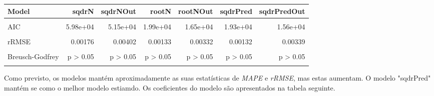 \documentclass[justified, 11pt]{scrartcl}\usepackage[]{graphicx}\usepackage[]{xcolor}
\newenvironment{knitrout}{}{} %
\begin{document}
\begin{knitrout}
\begin{table}
\begin{tabular}{l|r|r|r|r|r|r}
\hline
Model & sqdrN & sqdrNOut & rootN & rootNOut & sqdrPred & sqdrPredOut\\
\hline
\cellcolor{gray!6}{R2} & \cellcolor{gray!6}{0.929} & \cellcolor{gray!6}{0.973} & \cellcolor{gray!6}{0.374} & \cellcolor{gray!6}{0.378} & \cellcolor{gray!6}{0.449} & \cellcolor{gray!6}{0.468}\\
\hline
AIC & 5.98e+04 & 5.15e+04 & 1.99e+04 & 1.65e+04 & 1.93e+04 & 1.56e+04\\
\hline
\cellcolor{gray!6}{MAPE} & \cellcolor{gray!6}{0.129} & \cellcolor{gray!6}{0.109} & \cellcolor{gray!6}{0.0869} & \cellcolor{gray!6}{0.0854} & \cellcolor{gray!6}{0.0854} & \cellcolor{gray!6}{0.0875}\\
\hline
rRMSE & 0.00176 & 0.00402 & 0.00133 & 0.00332 & 0.00132 & 0.00339\\
\hline
\cellcolor{gray!6}{Breusch-Pagan} & \cellcolor{gray!6}{p > 0.05} & \cellcolor{gray!6}{p > 0.05} & \cellcolor{gray!6}{p > 0.05} & \cellcolor{gray!6}{p > 0.05} & \cellcolor{gray!6}{p = 0.0488} & \cellcolor{gray!6}{p > 0.05}\\
\hline
Breusch-Godfrey & p > 0.05 & p > 0.05 & p > 0.05 & p > 0.05 & p > 0.05 & p > 0.05\\
\hline
\cellcolor{gray!6}{Jarque-Bera} & \cellcolor{gray!6}{p < 0.05} & \cellcolor{gray!6}{p < 0.05} & \cellcolor{gray!6}{p < 0.05} & \cellcolor{gray!6}{p < 0.05} & \cellcolor{gray!6}{p < 0.05} & \cellcolor{gray!6}{p < 0.05}\\
\hline
\end{tabular}
\endgroup{}
\end{table}

\end{knitrout}
Como previsto, os modelos mantém aproximadamente as suas estatísticas de \textit{MAPE} e \textit{rRMSE}, mas estas aumentam. O modelo "sqdrPred" mantém se como o melhor modelo estiamdo.
Os coeficientes do modelo são apresentados na tabela seguinte.\\
\footnotesize
\end{document}
